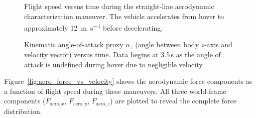 \begin{figure}[htbp]
  \centering
  \caption{Flight speed versus time during the straight-line aerodynamic characterization maneuver. The vehicle accelerates from hover to approximately \SI{12}{\meter\per\second} before decelerating.}
  \label{fig:speed_vs_time}
\end{figure}

\begin{figure}[htbp]
  \centering
  \caption{Kinematic angle-of-attack proxy $\alpha_z$ (angle between body $z$-axis and velocity vector) versus time. Data begins at 3.5\,s as the angle of attack is undefined during hover due to negligible velocity.}
  \label{fig:aoa_vs_time}
\end{figure}

Figure~\ref{fig:aero_force_vs_velocity} shows the aerodynamic force components as a function of flight speed during these maneuvers.
All three world-frame components ($F_{\text{aero},x}$, $F_{\text{aero},y}$, $F_{\text{aero},z}$) are plotted to reveal the complete force distribution.

